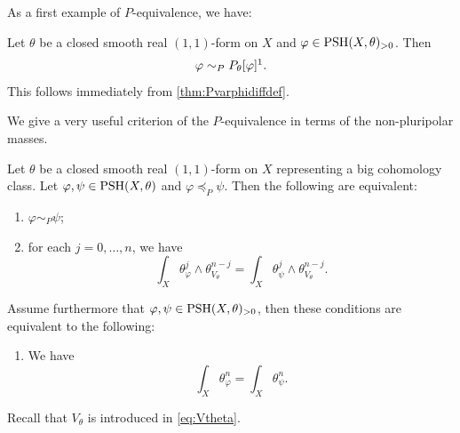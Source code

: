 As a first example of $P$-equivalence, we have:
\begin{example}\label{ex:Pequiv}
    Let $\theta$ be a closed smooth real $(1,1)$-form on $X$ and $\varphi\in \mathrm{PSH}(X,\theta)_{>0}$. Then
    \[
        \varphi\sim_P P_{\theta}[\varphi]\footnotemark.
    \]
    This follows immediately from \cref{thm:Pvarphidiffdef}.
\end{example}

We give a very useful criterion of the $P$-equivalence in terms of the non-pluripolar masses.
\begin{proposition}\label{prop:Pequivchar2}
    Let $\theta$ be a closed smooth real $(1,1)$-form on $X$ representing a big cohomology class.
    Let $\varphi,\psi\in \mathrm{PSH}(X,\theta)$ and $\varphi\preceq_P \psi$. Then the following are equivalent:
    \begin{enumerate}
        \item\label{itm:prop:Pequivchar2:1} $\varphi\sim_P \psi$;
        \item\label{itm:prop:Pequivchar2:2} for each $j=0,\ldots,n$, we have
            \begin{equation}\label{eq:mixedmassequal}
                \int_X \theta_{\varphi}^j\wedge \theta_{V_{\theta}}^{n-j}=\int_X \theta_{\psi}^j\wedge \theta_{V_{\theta}}^{n-j}.
            \end{equation}
    \end{enumerate}
    Assume furthermore that $\varphi,\psi\in \mathrm{PSH}(X,\theta)_{>0}$, then these conditions are equivalent to the following:
    \begin{enumerate}[resume]
        \item\label{itm:prop:Pequivchar2:3} We have
            \[
                \int_X \theta_{\varphi}^n=\int_X \theta_{\psi}^n.
            \]
    \end{enumerate}
\end{proposition}
Recall that $V_{\theta}$ is introduced in \eqref{eq:Vtheta}.

